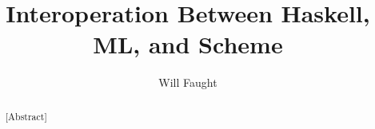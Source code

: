 \documentclass[12pt]{ucthesis}
\begin{document}
\title{Interoperation Between Haskell, ML, and Scheme}
\author{Will Faught}
\maketitle

\begin{frontmatter}

\copyrightpage
\approvalpage
\begin{abstract}
[Abstract]
\end{abstract}
\begin{acknowledgements}
[Acknowledgements]
\end{acknowledgements}
\tableofcontents
\listoftables
\listoffigures

\end{frontmatter}

\pagestyle{plain}
\renewcommand{\baselinestretch}{1.66}






\clearpage


\end{document}
